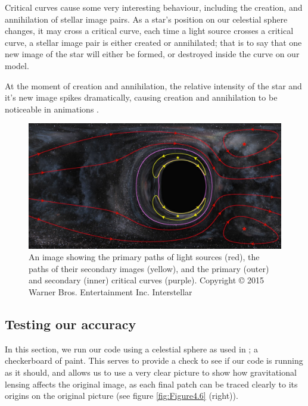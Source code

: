 \documentclass[oneside,openright,frontopenright, singlespacing]{dmathesis}
\begin{document}
\vspace{1em}
	Critical curves cause some very interesting behaviour, including the creation, and annihilation of stellar image pairs. As a star's position on our celestial sphere changes, it may cross a critical curve, each time a light source crosses a critical curve, a stellar image pair is either created or annihilated; that is to say that one new image of the star will either be formed, or destroyed inside the curve on our model. 

\vspace{1em}
	At the moment of creation and annihilation, the relative intensity of the star and it's new image spikes dramatically, causing creation and annihilation to be noticeable in animations \cite{thorne2015gravitational}.

\vspace{1em}
\begin{figure}[!ht]
	\centering
	\includegraphics[width=0.87\linewidth]{img/caustic}
	\caption{An image showing the primary paths of light sources (red), the paths of their secondary images (yellow), and the primary (outer) and secondary (inner) critical curves (purple). Copyright ©  2015 Warner Bros. Entertainment Inc. Interstellar}
	\label{fig:Figure4.5}
\end{figure}

\subsection{Testing our accuracy}\label{subsec:Subsection4.8.3}

	In this section, we run our code using a celestial sphere as used in \cite{thorne2015gravitational}; a checkerboard of paint. This serves to provide a check to see if our code is running as it should, and allows us to use a very clear picture to show how gravitational lensing affects the original image, as each final patch can be traced clearly to its origins on the original picture (see figure \ref{fig:Figure4.6} (right)).
\end{document}
